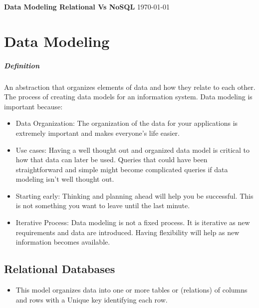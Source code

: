 \documentclass[
	paper=a4,%
	pagesize,%
	8pt, fleqn,%
	headings=small,%
	notitlepage,%
	parskip=never]%
	{scrreprt}
\newcommand{\mytitle}{Data Modeling Relational Vs NoSQL}
\begin{document}
\begin{multicols*}{3}

{\bfseries\sffamily\LARGE\mytitle} \vspace{0.35em}  \hfill \today \vspace{0.2em}




\chapter{Data Modeling}
\paragraph{Definition} An abstraction that organizes elements of data and how they relate to each other. The process of creating data models for an information system. Data modeling is important because:
\begin{itemize}
\item Data Organization: The organization of the data for your applications is extremely important and makes everyone's life easier.

\item Use cases: Having a well thought out and organized data model is critical to how that data can later be used. Queries that could have been straightforward and simple might become complicated queries if data modeling isn't well thought out.

\item Starting early: Thinking and planning ahead will help you be successful. This is not something you want to leave until the last minute.

\item Iterative Process: Data modeling is not a fixed process. It is iterative as new requirements and data are introduced. Having flexibility will help as new information becomes available.



\end{itemize}

\section{Relational Databases}
\begin{itemize}

\item This model organizes data into one or more tables or (relations) of columns and rows with a Unique key identifying each row.


\end{itemize}
\end{multicols*}
\end{document}
